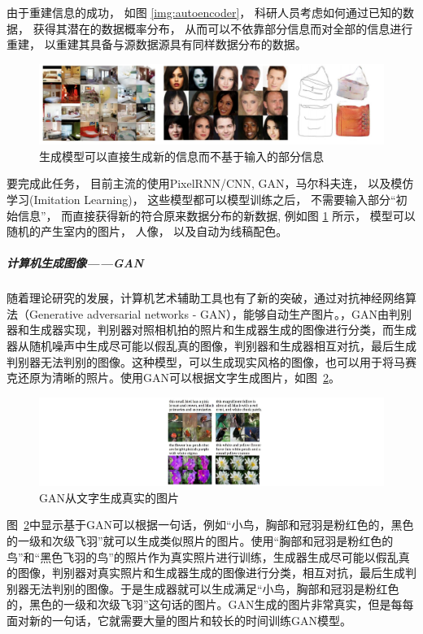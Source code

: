 由于重建信息的成功， 如图 \ref{img:autoencoder}， 科研人员考虑如何通过已知的数据， 获得其潜在的数据概率分布， 从而可以不依靠部分信息而对全部的信息进行重建， 以重建其具备与源数据源具有同样数据分布的数据。 

\begin{figure}[htbp]
    \centering  
    \includegraphics[width = .55\linewidth]{data/chapter-2/gene.png} 
    \caption{生成模型可以直接生成新的信息而不基于输入的部分信息} 
    \label{img:gene} 
\end{figure}

要完成此任务， 目前主流的使用PixelRNN/CNN, GAN，马尔科夫连， 以及模仿学习(Imitation Learning)， 这些模型都可以模型训练之后， 不需要输入部分“初始信息”， 而直接获得新的符合原来数据分布的新数据, 例如图 \ref{img:gene} 所示， 模型可以随机的产生室内的图片， 人像， 以及自动为线稿配色。  



\subparagraph{计算机生成图像——GAN} 随着理论研究的发展，计算机艺术辅助工具也有了新的突破，通过对抗神经网络算法（Generative adversarial networks - GAN），能够自动生产图片。\cite{radford2015unsupervised}，GAN由判别器和生成器实现，判别器对照相机拍的照片和生成器生成的图像进行分类，而生成器从随机噪声中生成尽可能以假乱真的图像，判别器和生成器相互对抗，最后生成判别器无法判别的图像。这种模型，可以生成现实风格的图像，也可以用于将马赛克还原为清晰的照片。使用GAN可以根据文字生成图片，如图~\ref{figure:GAN}。\cite{goodfellow2014generative} \cite{mcaleergenerative}

\begin{figure}[!htbp]
\centering
\includegraphics[width=\linewidth,keepaspectratio]{data/chapter-1/gan.jpeg}
\caption{GAN从文字生成真实的图片}
\label{figure:GAN}
\end{figure}

图~\ref{figure:GAN}中显示基于GAN可以根据一句话，例如“小鸟，胸部和冠羽是粉红色的，黑色的一级和次级飞羽”就可以生成类似照片的图片。使用“胸部和冠羽是粉红色的鸟”和“黑色飞羽的鸟”的照片作为真实照片进行训练，生成器生成尽可能以假乱真的图像，判别器对真实照片和生成器生成的图像进行分类，相互对抗，最后生成判别器无法判别的图像。于是生成器就可以生成满足“小鸟，胸部和冠羽是粉红色的，黑色的一级和次级飞羽”这句话的图片。GAN生成的图片非常真实，但是每每面对新的一句话，它就需要大量的图片和较长的时间训练GAN模型。


